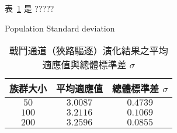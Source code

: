 表~\ref{tbl:result-of-experiment-narrow-avg-sd} 是 ?????

Population Standard deviation

\begin{table}[H]
  \centering
  \caption{戰鬥通道（狹路驅逐）演化結果之平均適應值與總體標準差 $\sigma$}
  \label{tbl:result-of-experiment-narrow-avg-sd}
  \bigskip
  \vspace{-5mm}
  \begin{tabular}[t]{ | c | c | c | }
    \hline
    族群大小 & 平均適應值 & 總體標準差 $\sigma$ \\\hline
    $50$  & $3.0087$ & $0.4739$ \\\hline
    $100$ & $3.2116$ & $0.1069$ \\\hline
    $200$ & $3.2596$ & $0.0855$ \\\hline
  \end{tabular}
\end{table}


